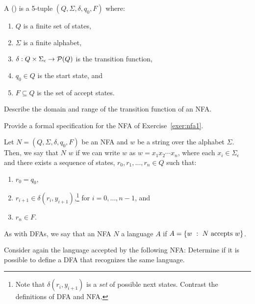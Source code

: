 \documentclass[twoside,letterpaper,openany]{book}
\begin{document}
\begin{defn}
A  () is a 5-tuple $(Q, \Sigma, \delta, q_0, F)$ where:
\begin{enumerate}
\item $Q$ is a finite set of states,
\item $\Sigma$ is a finite alphabet,
\item $\delta : Q \times \Sigma_\epsilon \to \mathcal{P}(Q)$ is the transition function,
\item $q_0 \in Q$ is the start state, and
\item $F \subseteq Q$ is the set of accept states.
\end{enumerate}

\end{defn}

\begin{exer}
Describe the domain and range of the transition function of an NFA.
\end{exer}

\begin{exer}
Provide a formal specification for the NFA of Exercise~\ref{exer:nfa1}.
\end{exer}

\begin{defn}
Let $N = (Q, \Sigma, \delta, q_0, F)$ be an NFA and $w$ be a string over the alphabet $\Sigma$. Then, we say that $N$  $w$ if we can write $w$ as $w = x_1 x_2 \cdots x_n$, where each $x_i \in \Sigma_\epsilon$ and there exists a sequence of states, $r_0, r_1, \ldots, r_n \in Q$ such that:
\begin{enumerate}
\item $r_0 = q_0$,
\item $r_{i+1} \in \delta(r_i, y_{i+1})$,\footnote{Note that $\delta(r_i, y_{i+1})$ is a \emph{set} of possible next states. Contrast the definitions of DFA and NFA.} for $i = 0, \ldots, n-1$, and
\item $r_n \in F$.
\end{enumerate}

As with DFAs, we say that an NFA $N$  a language $A$ if $A = \left\lbrace w\ :\ N~\textrm{accepts}~w \right\rbrace$.
\end{defn}

\begin{exer}
Consider again the language accepted by the following NFA:
\exernfaOne
Determine if it is possible to define a DFA that recognizes the same language.
\end{exer}
\end{document}
